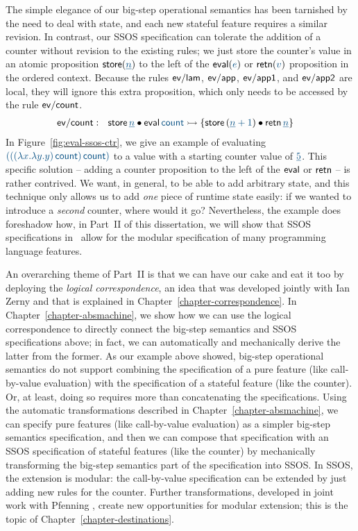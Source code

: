 The simple elegance of our big-step operational semantics has been
tarnished by the need to deal with state, and each new stateful
feature requires a similar revision.  In contrast, our SSOS
specification can tolerate the addition of a counter without revision
to the existing rules; we just store the counter's value in an atomic
proposition ${\sf store}(\obj{\underline{n}})$ to the left of the ${\sf
  eval}(\obj{e})$ or ${\sf retn}(\obj{v})$ proposition in the ordered
context. Because the rules ${\sf ev/lam}$, ${\sf ev/app}$, ${\sf
  ev/app1}$, and ${\sf ev/app2}$ are local, they will ignore this
extra proposition, which only needs to be accessed by the rule ${\sf
  ev/count}$.
\begin{align*}
{\sf ev/count} &:~~
  {\sf store}\,\obj{\underline n} \fuse {\sf eval}\,\obj{{\sf count}}
    \lefti \{ {\sf store}\,(\obj{\underline n + 1}) 
      \fuse {\sf retn}\,\obj{\underline n} \}
\end{align*}
In Figure~\ref{fig:eval-ssos-ctr}, we give an example of evaluating
$\obj{(((\lambda x.\lambda y.y)\,{\sf count})\,{\sf count})}$ to a
value with a starting counter value of $\obj{\underline 5}$. This
specific solution -- adding a counter proposition to the left of the
${\sf eval}$ or ${\sf retn}$ -- is rather contrived. We want, in
general, to be able to add arbitrary state, and this technique only
allows us to add {\it one} piece of runtime state easily: if we wanted
to introduce a {\it second} counter, where would it go? Nevertheless,
the example does foreshadow how, in Part~II of this dissertation, we will
show that SSOS specifications in \sls~allow for the modular
specification of many programming language features.


An overarching theme of Part~II is that we can have our cake and eat
it too by deploying the {\it logical correspondence}, an idea that was
developed jointly with Ian Zerny and that is explained in
Chapter~\ref{chapter-correspondence}. In
Chapter~\ref{chapter-absmachine}, we show how we can use the logical
correspondence to directly connect the big-step semantics and SSOS
specifications above; in fact, we can automatically and mechanically
derive the latter from the former. As our example above showed,
big-step operational semantics do not support combining the
specification of a pure feature (like call-by-value evaluation) with
the specification of a stateful feature (like the counter). Or, at
least, doing so requires more than concatenating the specifications.
Using the automatic transformations described in
Chapter~\ref{chapter-absmachine}, we can specify pure features (like
call-by-value evaluation) as a simpler big-step semantics
specification, and then we can compose that specification with an SSOS
specification of stateful features (like the counter) by mechanically
transforming the big-step semantics part of the specification into
SSOS. In SSOS, the extension is modular: the call-by-value
specification can be extended by just adding new rules for the
counter.  Further transformations, developed in joint work with
Pfenning \cite{simmons11logical}, create new opportunities for modular
extension; this is the topic of Chapter~\ref{chapter-destinations}.

